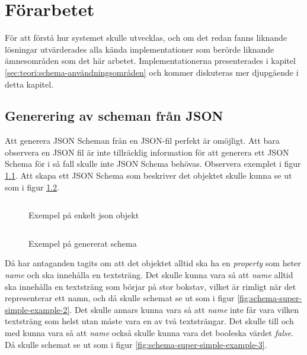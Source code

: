 \chapter{Förarbetet}
\label{sec:forarbete}
För att förstå hur systemet skulle utvecklas, och om det redan fanns liknande lösningar utvärderades alla kända implementationer som berörde liknande ämnesområden som det här arbetet. Implementationerna presenterades i kapitel \ref{sec:teori:schema-användningsområden} och kommer diskuteras mer djupgående i detta kapitel.

\section{Generering av scheman från JSON}
\label{sec:forarbete:json-till-schema}
Att generera JSON Scheman från en JSON-fil perfekt är omöjligt. Att bara observera en JSON fil är inte tillräcklig information för att generera ett JSON Schema för i så fall skulle inte JSON Schema behövas. Observera exemplet i figur \ref{fig:json-super-simple-example}. Att skapa ett JSON Schema som beskriver det objektet skulle kunna se ut som i figur \ref{fig:schema-super-simple-example-1}. 

\begin{figure}
	\inputminted[tabsize=2, frame=single, fontsize=\small, framesep=2mm]{json}{code/schema-generation-example/json-file.json}
	\vspace{-1.7em}
	\caption{Exempel på enkelt json objekt}
	\label{fig:json-super-simple-example}
\end{figure}

\begin{figure}
	\inputminted[tabsize=2, frame=single, fontsize=\small, framesep=2mm]{json}{code/schema-generation-example/schema-example1.json}
	\vspace{-1.7em}
	\caption{Exempel på genererat schema}
	\label{fig:schema-super-simple-example-1}
\end{figure}

Då har antaganden tagits om att det objektet alltid ska ha en \textit{property} som heter \textit{name} och ska innehålla en textsträng. Det skulle kunna vara så att \textit{name} alltid ska innehålla en textsträng som börjar på stor bokstav, vilket är rimligt när det representerar ett namn, och då skulle schemat se ut som i figur \ref{fig:schema-super-simple-example-2}. Det skulle annars kunna vara så att \textit{name} inte får vara vilken textsträng som helst utan måste vara en av två textsträngar. Det skulle till och med kunna vara så att \textit{name} också skulle kunna vara det booleska värdet \textit{false}. Då skulle schemat se ut som i figur \ref{fig:schema-super-simple-example-3}.

